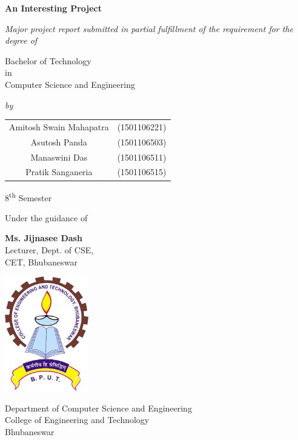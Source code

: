 \documentclass[a4paper,12pt,oneside]{book}
\title{\reporttitle}
\author{\memberonename (\memberoneregdno)\\
\membertwoname (\membertworegdno)\\
\memberthreename (\memberthreeregdno)\\
\memberfourregdno (\memberfourregdno)
}
\date{December 2018}
\newcommand{\reporttitle}{An Interesting Project}
\newcommand{\department}{Computer Science and Engineering}
\newcommand{\memberonename}{Amitosh Swain Mahapatra}
\newcommand{\memberoneregdno}{1501106221}
\newcommand{\membertwoname}{Asutosh Panda}
\newcommand{\membertworegdno}{1501106503}
\newcommand{\memberthreename}{Manaswini Das}
\newcommand{\memberthreeregdno}{1501106511}
\newcommand{\memberfourname}{Pratik Sanganeria}
\newcommand{\memberfourregdno}{1501106515}
\begin{document}
\frontmatter
\pagestyle{plain}

\begin{titlepage}
    \begin{center}

        \Huge{\textbf{\reporttitle}}
 
        \vspace{0.5cm}
        
        \normalsize
        \textit{
        Major project report submitted in partial fulfillment of the requirement for the degree of}
        
        \vspace{5pt}
        
        Bachelor of Technology\\
        in\\
        \department
        
        \textit{by}
        
        \vspace{5pt}
        
        \begin{tabular}{c c}
            \memberonename & (\memberoneregdno)\\
            \membertwoname & (\membertworegdno)\\
            \memberthreename & (\memberthreeregdno)\\
            \memberfourname & (\memberfourregdno)
        \end{tabular}
 
        \vspace{5pt}
        8\textsuperscript{th} Semester
 
        \vspace{1.5cm}
 
        Under the guidance of
        
        \vspace{5pt}
        
        \textbf{Ms. Jijnasee Dash}\\
        Lecturer, Dept. of CSE,\\
        CET, Bhubaneswar
 
        \vspace{1.5cm}
        
        \includegraphics[height=5cm]{images/cet.png}
        
        \vfill
 
        \Large
        Department of \department\\
        College of Engineering and Technology\\
        Bhubaneswar
    \end{center}
\end{titlepage}
\end{document}
